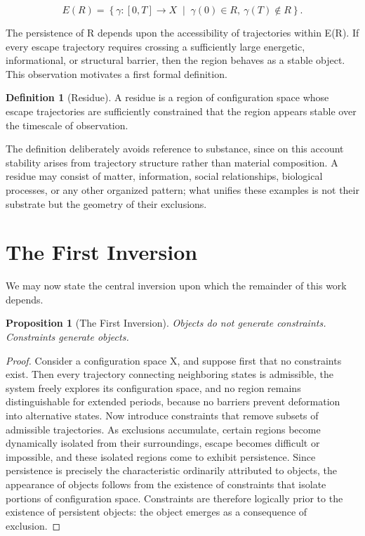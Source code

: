\documentclass[11pt,oneside]{book}
\theoremstyle{plain}
\newtheorem{proposition}[theorem]{Proposition}
\theoremstyle{definition}
\newtheorem{definition}[theorem]{Definition}
\theoremstyle{remark}
\begin{document}
\begin{equation}
E(R)
=
\left\{
\gamma : [0,T]
\to X
\;\middle|\;
\gamma(0)\in R,
\
\gamma(T)\notin R
\right\}.
\end{equation}

The persistence of R depends upon the accessibility of trajectories within E(R). If every escape trajectory requires crossing a sufficiently large energetic, informational, or structural barrier, then the region behaves as a stable object. This observation motivates a first formal definition.

\begin{definition}[Residue]
A residue is a region of configuration space whose escape trajectories are sufficiently constrained that the region appears stable over the timescale of observation.
\end{definition}

The definition deliberately avoids reference to substance, since on this account stability arises from trajectory structure rather than material composition. A residue may consist of matter, information, social relationships, biological processes, or any other organized pattern; what unifies these examples is not their substrate but the geometry of their exclusions.

\section{The First Inversion}

We may now state the central inversion upon which the remainder of this work depends.

\begin{proposition}[The First Inversion]
Objects do not generate constraints. Constraints generate objects.
\end{proposition}

\begin{proof}
Consider a configuration space X, and suppose first that no constraints exist. Then every trajectory connecting neighboring states is admissible, the system freely explores its configuration space, and no region remains distinguishable for extended periods, because no barriers prevent deformation into alternative states. Now introduce constraints that remove subsets of admissible trajectories. As exclusions accumulate, certain regions become dynamically isolated from their surroundings, escape becomes difficult or impossible, and these isolated regions come to exhibit persistence. Since persistence is precisely the characteristic ordinarily attributed to objects, the appearance of objects follows from the existence of constraints that isolate portions of configuration space. Constraints are therefore logically prior to the existence of persistent objects: the object emerges as a consequence of exclusion.
\end{proof}
\end{document}
